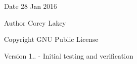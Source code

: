 \begin{DoxyDate}{Date}
28 Jan 2016 
\end{DoxyDate}
\begin{DoxyAuthor}{Author}
Corey Lakey 
\end{DoxyAuthor}
\begin{DoxyCopyright}{Copyright}
G\+N\+U Public License 
\end{DoxyCopyright}
\begin{DoxyVersion}{Version}
1.. -\/ Initial testing and verification 
\end{DoxyVersion}
